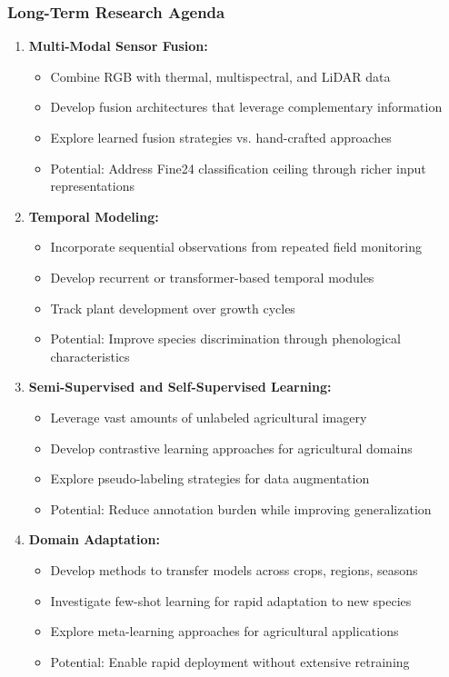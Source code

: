 \subsubsection{Long-Term Research Agenda}

\begin{enumerate}
    \item \textbf{Multi-Modal Sensor Fusion:}
    \begin{itemize}
        \item Combine RGB with thermal, multispectral, and LiDAR data
        \item Develop fusion architectures that leverage complementary information
        \item Explore learned fusion strategies vs. hand-crafted approaches
        \item Potential: Address Fine24 classification ceiling through richer input representations
    \end{itemize}
    
    \item \textbf{Temporal Modeling:}
    \begin{itemize}
        \item Incorporate sequential observations from repeated field monitoring
        \item Develop recurrent or transformer-based temporal modules
        \item Track plant development over growth cycles
        \item Potential: Improve species discrimination through phenological characteristics
    \end{itemize}
    
    \item \textbf{Semi-Supervised and Self-Supervised Learning:}
    \begin{itemize}
        \item Leverage vast amounts of unlabeled agricultural imagery
        \item Develop contrastive learning approaches for agricultural domains
        \item Explore pseudo-labeling strategies for data augmentation
        \item Potential: Reduce annotation burden while improving generalization
    \end{itemize}
    
    \item \textbf{Domain Adaptation:}
    \begin{itemize}
        \item Develop methods to transfer models across crops, regions, seasons
        \item Investigate few-shot learning for rapid adaptation to new species
        \item Explore meta-learning approaches for agricultural applications
        \item Potential: Enable rapid deployment without extensive retraining
    \end{itemize}
    

\end{enumerate}
